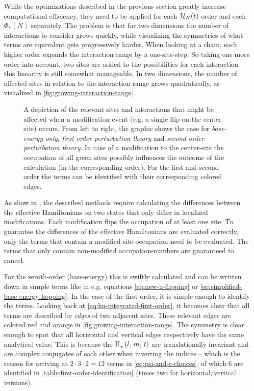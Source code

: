 While the optimizations described in the previous section greatly increase computational efficiency, they need to be applied for each $\mathcal{H}_{N}(t)$-order and each $\Phi_\ast(N)$ separately.
The problem is that for two dimensions the number of interactions to consider grows quickly, while visualizing the symmetries of what terms are equivalent gets progressively harder.
When looking at a chain, each higher order expands the interaction range by a one-site-step. 
So taking one more order into account, two sites are added to the possibilities for each interaction -- this linearity is still somewhat manageable.
In two dimensions, the number of affected sites in relation to the interaction range grows quadratically, as visualized in \autoref{fig:growing-interaction-range}.

\begin{figure}[htbp]
    \centering
    
    \caption{
        A depiction of the relevant sites and interactions that might be affected when a modification-event (e.g. a single flip on the center site) occurs.
        From left to right, the graphic shows the case for \emph{base-energy only}, \emph{first order perturbation theory} and \emph{second order perturbation theory}.
        In case of a modification to the center-site the occupation of all green sites possibly influences the outcome of the calculation (in the corresponding order). For the first and second order the terms can be identified with their corresponding colored edges.
    }
    \label{fig:growing-interaction-range}
\end{figure}

As show in , the described methods require calculating the differences between the effective Hamiltonians on two states that only differ in localized modifications.
Each modification flips the occupation of at least one site. 
To guarantee the differences of the effective Hamiltonians are evaluated correctly, only the terms that contain a modified site-occupation need to be evaluated. 
The terms that only contain non-modified occupation-numbers are guaranteed to cancel.

For the zeroth-order (base-energy) this is swiftly calculated and can be written down in simple terms like in e.g. equations \ref{eq:new-n-flipping} or \ref{eq:simplified-base-energy-hopping}.
In the case of the first order, it is simple enough to identify the terms.
Looking back at \autoref{eq:hn-integrated-first-order}, it becomes clear that all terms are described by \emph{edges} of two adjacent sites.
These relevant edges are colored red and orange in \autoref{fig:growing-interaction-range}. 
The symmetry is clear enough to spot that all horizontal and vertical edges respectively have the same analytical value.
This is because the $\Pi^{}_\text{$\ast$}\left(l,\,m,\,t\right)$ are translationally invariant and are complex conjugates of each other when inverting the indices -- which is the reason for arriving at $2\cdot 3 \cdot 2 = 12$ terms in \autoref{eq:psi-and-c-choices}, of which 6 are identified in \autoref{table:first-order-identification} (times two for horizontal/vertical versions).

